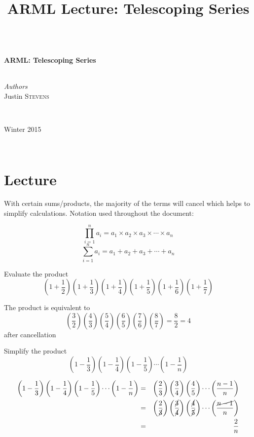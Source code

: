 
\title{ARML Lecture:  Telescoping Series}

\begin{center}
\HRule \\[0.4cm]
{ \huge \bfseries ARML: Telescoping Series}\\[0.4cm] %
\HRule \\[1.5cm]
\begin{minipage}{0.4\textwidth}
\begin{flushleft} \large
\emph{Authors}\\
Justin \textsc{Stevens} \newline
\end{flushleft}
\end{minipage}
~
\begin{minipage}{0.4\textwidth}
\begin{flushright} \large
Winter 2015
\end{flushright}
\end{minipage}\\[0.5cm]
\end{center}

\section{Lecture}

With certain sums/products, the majority of the terms will cancel which helps to simplify calculations.  Notation used throughout the document:

$$\prod_{i=1}^{n}a_i=a_1\times a_2\times a_3\times \cdots \times a_n$$
$$\sum_{i=1}^{n}a_i=a_1+a_2+a_3+\cdots+a_n$$

\begin{exmp}[Mathcounts]  Evaluate the product $$\left(1+\frac12\right)\left(1+\frac13\right)\left(1+\frac14\right)\left(1+\frac15\right)\left(1+\frac16\right)\left(1+\frac17\right)$$ \end{exmp}
\begin{soln}  
The product is equivalent to $$\left(\frac32\right)\left(\frac43\right)\left(\frac54\right)\left(\frac65\right)\left(\frac76\right)\left(\frac87\right)=\frac{8}{2}=4$$ after cancellation   \end{soln}

\begin{exmp}  Simplify the product $$\left(1-\frac13\right)\left(1-\frac14\right)\left(1-\frac15\right)\cdots\left(1-\frac1n\right)$$ \end{exmp}
\begin{soln}
\begin{eqnarray*}  \left(1-\frac13\right)\left(1-\frac14\right)\left(1-\frac15\right)\cdots \left(1-\frac1n\right) &=& \left(\frac23\right)\left(\frac34\right)\left(\frac45\right)\cdots\left(\frac{n-1}{n}\right) \\ 
&=& \left(\frac{2}{\cancel{3}}\right)\left(\frac{\cancel{3}}{\cancel{4}}\right)\left(\frac{\cancel{4}}{\cancel{5}}\right)\cdots \left(\frac{\cancel{n-1}}n \right) \\ &=& \frac{2}{n} \end{eqnarray*}
\end{soln}


